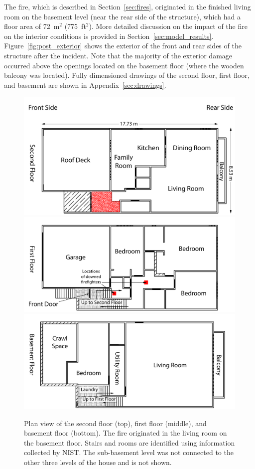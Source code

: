 \documentclass[12pt,oneside]{book}
\begin{document}
The fire, which is described in Section~\ref{sec:fires}, originated in the finished living room on the basement level (near the rear side of the structure), which had a floor area of 72~m$^2$ (775~ft$^2$). More detailed discussion on the impact of the fire on the interior conditions is provided in Section~\ref{sec:model_results}. Figure~\ref{fig:post_exterior} shows the exterior of the front and rear sides of the structure after the incident. Note that the majority of the exterior damage occurred above the openings located on the basement floor (where the wooden balcony was located). Fully dimensioned drawings of the second floor, first floor, and basement are shown in Appendix~\ref{sec:drawings}.


\clearpage


\begin{figure}[!ht]
\includegraphics[width=5.0in]{../Figures/Plan_Second_Floor}
\includegraphics[width=5.0in]{../Figures/Plan_First_Floor}
\includegraphics[width=5.0in]{../Figures/Plan_Basement_Floor}
\caption[Plan view of the second floor, first floor, and basement floor.]
{Plan view of the second floor (top), first floor (middle), and basement floor (bottom). The fire originated in the living room on the basement floor. Stairs and rooms are identified using information collected by NIST. The sub-basement level was not connected to the other three levels of the house and is not shown.}
\label{fig:floor_plan}
\end{figure}
\end{document}
